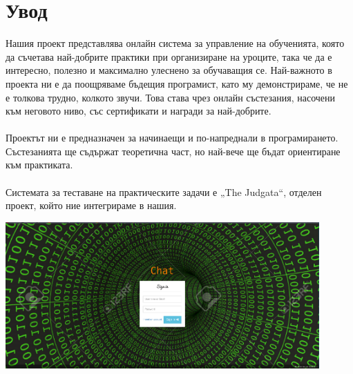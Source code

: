 \documentclass[28pt]{article}
\begin{document}
\section{Увод}
	Нашия проект представлява онлайн система за управление на обученията, която да съчетава най-добрите практики при организиране на уроците, така че да е интересно, полезно и максимално улеснено за обучаващия се. Най-важното в проекта ни е да поощряваме бъдещия програмист, като му демонстрираме, че не е толкова трудно, колкото звучи. Това става чрез онлайн състезания, насочени към неговото ниво, със сертификати и награди за най-добрите. \\
\\
	Проектът ни е предназначен за начинаещи и по-напреднали в програмирането. Състезанията ще съдържат теоретична част, но най-вече ще бъдат ориентиране към практиката. \\
\\
	Системата за теставане на практическите задачи е „\foreignlanguage{english}{The Judgata}“, отделен проект, който ние интегрираме в нашия. \\\vspace{0.5cm}
	
	\includegraphics[width=0.9\textwidth]{chat} \\
	\newpage
\end{document}
